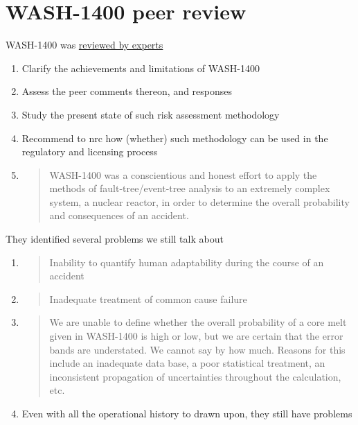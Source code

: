 \documentclass[aspectratio=1610,pdftex,dvipsnames,compress,xcolor={dvipsnames}]{beamer}
\newcommand{\acs}{\acrshort} %
\begin{document}
\section{WASH-1400 peer review}


\addtocounter{framenumber}{-1}
\begin{frame}{WASH-1400 was \href{http://www.iaea.org/inis/collection/NCLCollectionStore/_Public/10/452/10452296.pdf}{reviewed by experts}}
    \begin{enumerate}[series=outerlist,topsep=0pt,itemsep=7pt,leftmargin=*,label=(\arabic*)]
        \item Clarify the achievements and limitations of WASH-1400
        \item Assess the peer comments thereon, and responses
        \item Study the present state of such risk assessment methodology
        \item Recommend to \acs{nrc} how (whether) such methodology can be used in the regulatory and licensing process
            \vspace{0.25in}
        \item[]
            \begin{quote}
                WASH-1400 was a conscientious and honest effort to apply the methods of fault-tree/event-tree analysis to an extremely complex system, a nuclear reactor, in order to determine the overall probability and consequences of an accident.
            \end{quote}
    \end{enumerate}
\end{frame}


\begin{frame}{They identified several problems we still talk about}
    \begin{enumerate}[series=outerlist,topsep=0pt,itemsep=17pt,leftmargin=*,label=(\arabic*)]
        \item[]
            \begin{quote}
                Inability to quantify human adaptability during the course of an accident
            \end{quote}
        \item[]
            \begin{quote}
                Inadequate treatment of common cause failure 
            \end{quote}
        \item[]
            \begin{quote}
                We are unable to define whether the overall probability of a core melt given in WASH-1400 is high or low, but we are certain that the error bands are understated. We cannot say by how much. Reasons for this include an inadequate data base, a poor statistical treatment, an inconsistent propagation of uncertainties throughout the calculation, etc.
            \end{quote}
        \item[]Even with all the operational history to drawn upon, they still have problems
    \end{enumerate}
\end{frame}
\end{document}
